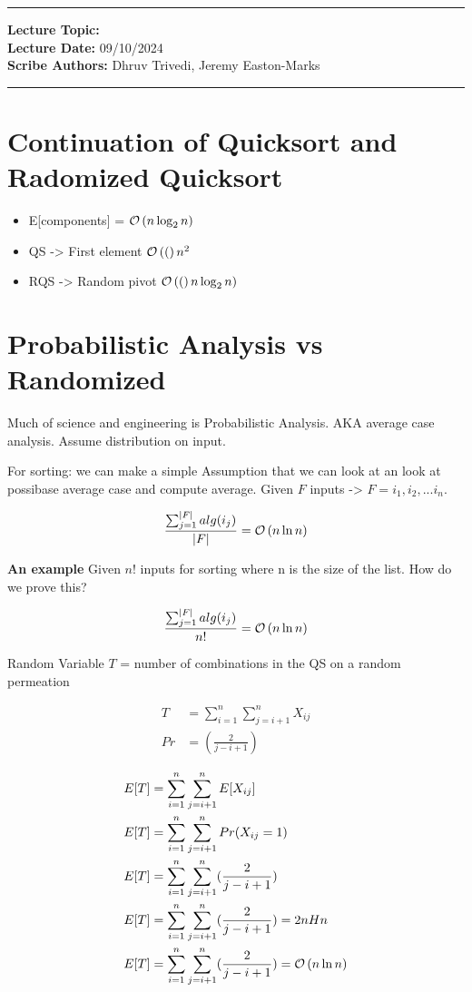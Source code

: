 \hrule
\vspace{0.1in}
\noindent
\textbf{Lecture Topic: } \\
\textbf{Lecture Date: } 09/10/2024 \\
\textbf{Scribe Authors: }Dhruv Trivedi, Jeremy Easton-Marks
\vspace{0.1in}
\hrule
\vspace{0.1in}

\section*{Continuation of Quicksort and Radomized Quicksort}

\begin{itemize}
    \item E[components] = $\mathcal{O}\left(n\log_2 n\right)$ 
    \item QS -> First element $\mathcal{O}\left((\right)n^2$
    \item RQS -> Random pivot $\mathcal{O}\left((\right)n\log_2n)$

\end{itemize}

\section*{Probabilistic Analysis vs Randomized}
Much of science and engineering is Probabilistic Analysis. AKA average case analysis. Assume distribution on input.

For sorting: we can make a simple Assumption that we can look at an look at possibase average case and compute average. Given $F$ inputs -> $F={i_1,i_2,...i_n}$.

\[
\frac{\sum_{j=1}^{|F|} alg(i_j)}{|F|} = \mathcal{O}\left(n \ln n\right)
\]

\textbf{An example}
Given $n!$ inputs for sorting where n is the size of the list. How do we prove this?

\[
\frac{\sum_{j=1}^{|F|} alg(i_j)}{n!} = \mathcal{O}\left(n \ln n\right)
\]

Random Variable $T$ = number of combinations in the QS on a random permeation


\[
\begin{aligned}
T & = \sum_{i=1}^{n}\sum_{j=i+1}^{n}X_{ij} \\
Pr & = (\frac{2}{j-i+1})
\end{aligned}
\]

\[
\begin{aligned}
E[T] & = \sum_{i=1}^{n}\sum_{j=i+1}^{n}E[X_{ij}] \\
E[T] & = \sum_{i=1}^{n}\sum_{j=i+1}^{n}Pr(X_{ij}=1) \\
E[T] & = \sum_{i=1}^{n}\sum_{j=i+1}^{n}(\frac{2}{j-i+1}) \\
E[T] & = \sum_{i=1}^{n}\sum_{j=i+1}^{n}(\frac{2}{j-i+1}) = 2nHn \\
E[T] & = \sum_{i=1}^{n}\sum_{j=i+1}^{n}(\frac{2}{j-i+1}) = \mathcal{O}\left(n \ln n\right)\\
\end{aligned}
\]



